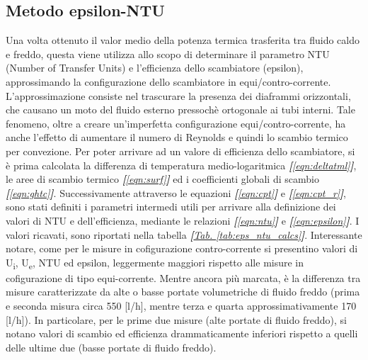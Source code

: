 \documentclass[a4paper,10pt]{article}                                                                                       %
\begin{document}
\subsection{Metodo epsilon-NTU}                                                                                             %
\label{subsec:espntu_meth}                                                                                                  %
  Una volta ottenuto il valor medio della potenza termica trasferita tra fluido caldo e freddo, questa viene utilizza allo
  scopo di determinare il parametro NTU (Number of Transfer Units) e l'efficienza dello scambiatore (epsilon),
  approssimando la configurazione dello scambiatore in equi/contro-corrente. L'approssimazione consiste nel trascurare la
  presenza dei diaframmi orizzontali, che causano un moto del fluido esterno pressochè ortogonale ai tubi interni. Tale
  fenomeno, oltre a creare un'imperfetta configurazione equi/contro-corrente, ha anche l'effetto di aumentare il numero
  di Reynolds e quindi lo scambio termico per convezione. Per poter arrivare ad un valore di efficienza dello scambiatore,
  si è prima calcolata la differenza di temperatura medio-logaritmica \textit{\textbf{[}\ref{eqn:deltatml}\textbf{]}}, le
  aree di scambio termico \textit{\textbf{[}\ref{eqn:surf}\textbf{]}} ed i coefficienti globali di scambio
  \textit{\textbf{[}\ref{eqn:ghtc}\textbf{]}}. Successivamente attraverso le equazioni
  \textit{\textbf{[}\ref{eqn:cpt}\textbf{]}} e \textit{\textbf{[}\ref{eqn:cpt_r}\textbf{]}}, sono stati definiti i
  parametri intermedi utili per arrivare alla definizione dei valori di NTU e dell'efficienza, mediante le relazioni
  \textit{\textbf{[}\ref{eqn:ntu}\textbf{]}} e \textit{\textbf{[}\ref{eqn:epsilon}\textbf{]}}. I valori ricavati, sono
  riportati nella tabella \textit{\textbf{[}\hyperref[tab:eps_ntu_calcs]{Tab. }\ref{tab:eps_ntu_calcs}\textbf{]}}.
  Interessante notare, come per le misure in cofigurazione contro-corrente si presentino valori di U\textsubscript{i},
  U\textsubscript{e}, NTU ed epsilon, leggermente maggiori rispetto alle misure in cofigurazione di tipo equi-corrente.
  Mentre ancora più marcata, è la differenza tra misure caratterizzate da alte o basse portate volumetriche di fluido
  freddo (prima e seconda misura circa 550 [l/h], mentre terza e quarta approssimativamente 170 [l/h]). In particolare, per
  le prime due misure (alte portate di fluido freddo), si notano valori di scambio ed efficienza drammaticamente inferiori
  rispetto a quelli delle ultime due (basse portate di fluido freddo).
\end{document}
